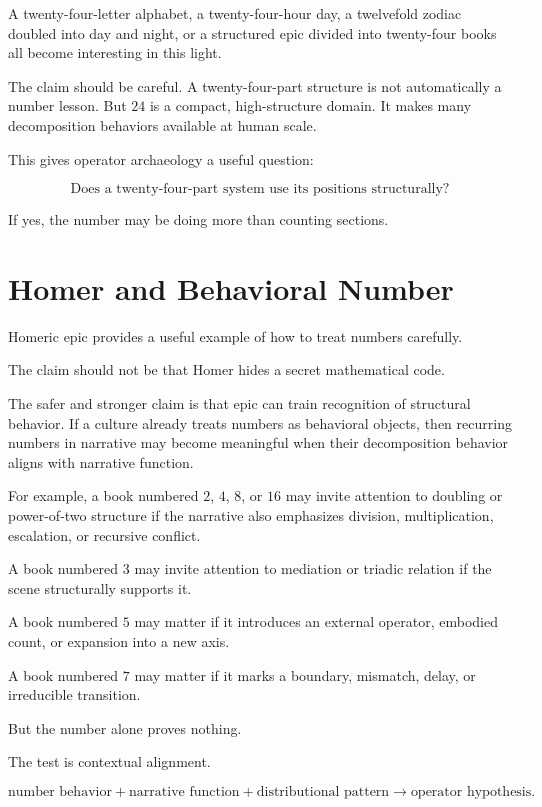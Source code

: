 \documentclass[11pt]{book}
\begin{document}
A twenty-four-letter alphabet, a twenty-four-hour day, a twelvefold zodiac doubled into day and night, or a structured epic divided into twenty-four books all become interesting in this light.

The claim should be careful. A twenty-four-part structure is not automatically a number lesson. But \(24\) is a compact, high-structure domain. It makes many decomposition behaviors available at human scale.

This gives operator archaeology a useful question:

\[
\text{Does a twenty-four-part system use its positions structurally?}
\]

If yes, the number may be doing more than counting sections.

\section{Homer and Behavioral Number}

Homeric epic provides a useful example of how to treat numbers carefully.

The claim should not be that Homer hides a secret mathematical code.

The safer and stronger claim is that epic can train recognition of structural behavior. If a culture already treats numbers as behavioral objects, then recurring numbers in narrative may become meaningful when their decomposition behavior aligns with narrative function.

For example, a book numbered \(2\), \(4\), \(8\), or \(16\) may invite attention to doubling or power-of-two structure if the narrative also emphasizes division, multiplication, escalation, or recursive conflict.

A book numbered \(3\) may invite attention to mediation or triadic relation if the scene structurally supports it.

A book numbered \(5\) may matter if it introduces an external operator, embodied count, or expansion into a new axis.

A book numbered \(7\) may matter if it marks a boundary, mismatch, delay, or irreducible transition.

But the number alone proves nothing.

The test is contextual alignment.

\[
\text{number behavior}
+
\text{narrative function}
+
\text{distributional pattern}
\rightarrow
\text{operator hypothesis}.
\]
\end{document}
